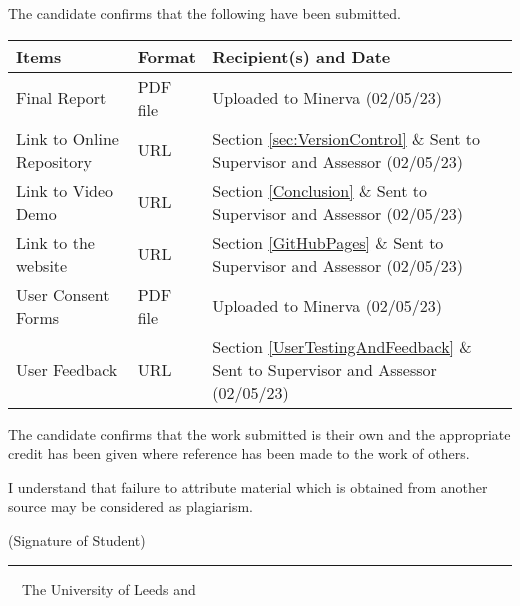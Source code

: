 \frontcover

\clearpage

\noindent The candidate confirms that the following have been submitted.\\


\begin{table}[ht!]
\begin{tabular}{|p{}|p{}|p{}|}
\hline 
Items & Format & Recipient(s) and Date \\ 
\hline 
Final Report & PDF file & Uploaded to Minerva (02/05/23) \\ 
\hline 
Link to Online Repository & URL & Section \ref{sec:VersionControl} \& Sent to Supervisor and Assessor (02/05/23) \\
\hline
Link to Video Demo & URL & Section \ref{Conclusion} \& Sent to Supervisor and Assessor (02/05/23) \\
\hline
Link to the website & URL & Section \ref{GitHubPages} \& Sent to Supervisor and Assessor (02/05/23) \\
\hline
User Consent Forms & PDF file & Uploaded to Minerva (02/05/23) \\
\hline
User Feedback & URL & Section \ref{UserTestingAndFeedback} \& Sent to Supervisor and Assessor (02/05/23) \\
\hline
\end{tabular} 
\end{table}


\vfill

\noindent The candidate confirms that the work submitted is their own and the appropriate credit has been given where reference has been made to the work of others.

\vfill

\noindent I understand that failure to attribute material which is obtained from another source may be considered as plagiarism.

\vfill

\flushright(Signature of Student) \rule{50mm}{1pt}
\flushleft

\vfill

\textcopyright~\session~The University of Leeds and~\fullname

\begin{dissertationsummary}

\end{dissertationsummary}

\tableofcontents

\clearpage


